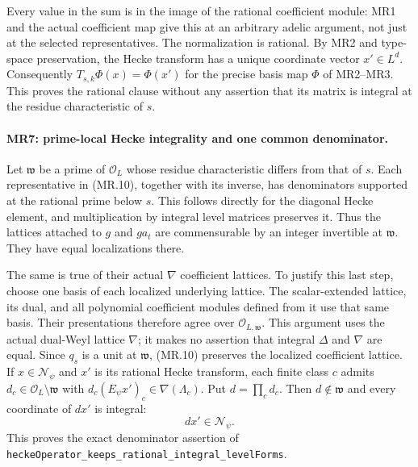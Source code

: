Every value in the sum is in the image of the rational coefficient
module: MR1 and the actual coefficient map give this at an arbitrary
adelic argument, not just at the selected representatives.
The normalization is rational. By MR2 and type-space preservation,
the Hecke transform
has a unique coordinate vector $x'\in L^d$. Consequently
$T_{s,k}\Phi(x)=\Phi(x')$ for the precise basis map $\Phi$ of MR2--MR3.
This proves the rational clause without any assertion that its
matrix is integral at the residue characteristic of $s$.

\paragraph{MR7: prime-local Hecke integrality and one common denominator.}
Let $\mathfrak w$ be a prime of $\mathcal O_L$ whose residue
characteristic differs from that of $s$. Each representative in
(MR.10), together with its inverse, has denominators supported at
the rational prime below $s$. This follows directly for the
diagonal Hecke element, and multiplication by integral level
matrices preserves it. Thus the lattices attached to $g$ and
$ga_t$ are commensurable by an integer invertible at
$\mathfrak w$. They have equal localizations there.

The same is true of their actual $\nabla$ coefficient lattices.
To justify this last step, choose one basis of each localized
underlying lattice. The scalar-extended lattice, its dual, and all
polynomial coefficient modules defined from it use that same basis.
Their presentations therefore agree over $\mathcal O_{L,\mathfrak w}$.
This argument uses the actual dual-Weyl lattice $\nabla$; it makes
no assertion that integral $\Delta$ and $\nabla$ are equal.
Since $q_s$ is a unit at $\mathfrak w$, (MR.10) preserves the
localized coefficient lattice. If $x\in\mathcal N_{\psi}$ and $x'$
is its rational Hecke transform, each finite class $c$ admits
$d_c\in\mathcal O_L\setminus\mathfrak w$ with
$d_c(E_\psi x')_c\in\nabla(\Lambda_c)$. Put $d=\prod_c d_c$.
Then $d\notin\mathfrak w$ and every coordinate of $dx'$ is integral:
\[
                    dx'\in\mathcal N_\psi.          \tag{MR.11}
\]
This proves the exact denominator assertion of
\texttt{heckeOperator\_keeps\_rational\_integral\_levelForms}.


